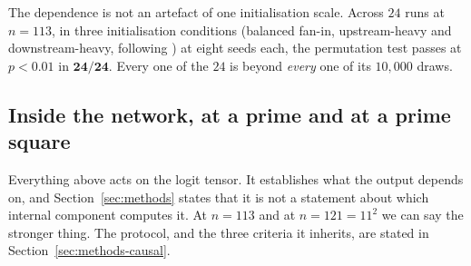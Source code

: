 The dependence is not an artefact of one initialisation scale. Across $24$ runs at $n = 113$,
in three initialisation conditions (balanced fan-in, upstream-heavy and downstream-heavy,
following \citet{kunin2024getrich}) at eight seeds each, the permutation test passes at
$p < 0.01$ in $\mathbf{24/24}$. Every one of the $24$ is beyond \emph{every} one of its
$10{,}000$ draws.

\subsection{Inside the network, at a prime and at a prime square}
\label{sec:causal-internal}

Everything above acts on the logit tensor. It establishes what the output depends on, and
Section~\ref{sec:methods} states that it is not a statement about which internal
component computes it. At $n = 113$ and at $n = 121 = 11^{2}$ we can say the stronger thing.
The protocol, and the three criteria it inherits, are stated in
Section~\ref{sec:methods-causal}.

